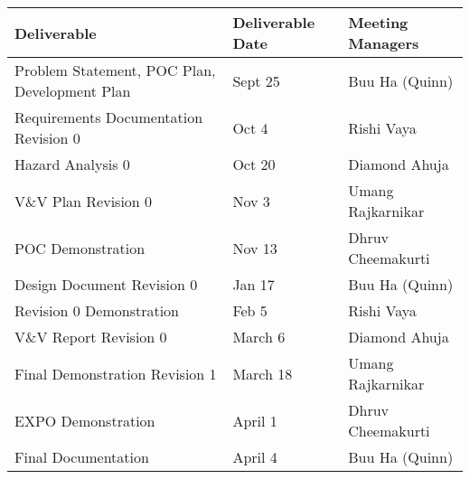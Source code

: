 \documentclass{article}
\begin{document}
\begin{table}[H]
\begin{tabular}{|p{4cm}|p{3cm}|p{3cm}|}
\hline
\textbf{Deliverable}                                   & \textbf{Deliverable Date}  & \textbf{Meeting Managers}\\ \hline
Problem Statement, POC Plan, Development Plan & Sept 25           &Buu Ha (Quinn)\\ \hline
Requirements Documentation Revision 0         & Oct 4             &Rishi Vaya\\ \hline
Hazard Analysis 0                             & Oct 20            &Diamond Ahuja\\ \hline
V\&V Plan Revision 0                           & Nov 3             &Umang Rajkarnikar\\ \hline
POC Demonstration                             & Nov 13            &Dhruv Cheemakurti\\ \hline
Design Document Revision 0                    & Jan 17            &Buu Ha (Quinn)\\ \hline
Revision 0 Demonstration                      & Feb 5             &Rishi Vaya\\ \hline
V\&V Report Revision 0                         & March 6           &Diamond Ahuja\\ \hline
Final Demonstration Revision 1                & March 18          &Umang Rajkarnikar\\ \hline
EXPO Demonstration                            & April 1           &Dhruv Cheemakurti\\ \hline
Final Documentation                           & April 4           &Buu Ha (Quinn)\\ \hline
\end{tabular}
\end{table}
\end{document}
